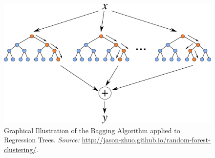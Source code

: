 \begin{figure}[H]
\centering
\includegraphics[scale=0.6]{Bagging/baggedtree.png}
\caption[Graphical Illustration of the Bagging algorithm applied to Regression Trees.]{Graphical Illustration of the Bagging Algorithm applied to Regression Trees. \textit{Source:} \url{http://jason-zhuo.github.io/random-forest-clustering/}.}\label{fig:Ill_Bag}
\end{figure}

